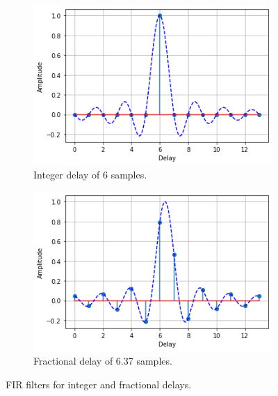 \begin{figure}
	\centering
	\begin{subfigure}{.4\linewidth}
		\includegraphics[width=\linewidth]{./figures/screenshots/Fractional_delay_6}
		\caption{Integer delay of 6 samples.}
	\end{subfigure}
	\hskip 5mm
	\begin{subfigure}{.4\linewidth}
		\includegraphics[width=\linewidth]{./figures/screenshots/Fractional_delay_637}
		\caption{Fractional delay of 6.37 samples.}
	\end{subfigure}
	\caption{
		FIR filters for integer and fractional delays.
		\label{fig:fractional-delay-sinc-plot}
	}
\end{figure}

